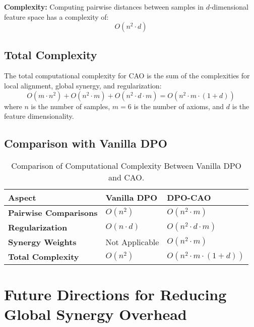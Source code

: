 \textbf{Complexity:} Computing pairwise distances between samples in \(d\)-dimensional feature space has a complexity of:
\[
O(n^2 \cdot d)
\]

\subsection{Total Complexity}
The total computational complexity for CAO is the sum of the complexities for local alignment, global synergy, and regularization:
\[
O(m \cdot n^2) + O(n^2 \cdot m) + O(n^2 \cdot d \cdot m) = O(n^2 \cdot m \cdot (1 + d))
\]
where \(n\) is the number of samples, \(m = 6\) is the number of axioms, and \(d\) is the feature dimensionality.

\subsection{Comparison with Vanilla DPO}

\begin{table}[ht!]
\centering
\caption{Comparison of Computational Complexity Between Vanilla DPO and CAO.}
\begin{adjustbox}{width=\columnwidth}
\begin{tabular}{|p{}|p{}|p{}|}
\hline
\textbf{Aspect}           & \textbf{Vanilla DPO}                  & \textbf{DPO-CAO} \\ \hline
\textbf{Pairwise Comparisons} & $O(n^2)$                              & $O(n^2 \cdot m)$ \\ \hline
\textbf{Regularization}       & $O(n \cdot d)$                        & $O(n^2 \cdot d \cdot m)$ \\ \hline
\textbf{Synergy Weights}      & Not Applicable                        & $O(n^2 \cdot m)$ \\ \hline
\textbf{Total Complexity}     & $O(n^2)$                              & $O(n^2 \cdot m \cdot (1 + d))$ \\ \hline
\end{tabular}
\end{adjustbox}
\label{tab:complexity_comparison}
\end{table}

\section{Future Directions for Reducing Global Synergy Overhead}
\label{sec:appendix_synergy_overhead_reduction}


